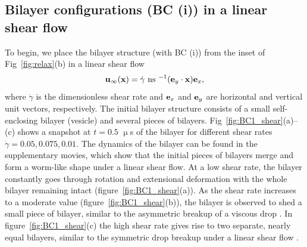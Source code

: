 \documentclass[prb,preprint,showpacs,preprintnumbers,amsmath,amssymb,longbibliography]{revtex4-1}
\newcommand{\xx}{\mathbf{x}}
\newcommand{\uu}{\mathbf{u}}
\begin{document}
\subsection{Bilayer configurations (BC (i)) in a linear shear flow}
To begin, we place the bilayer structure (with BC (i)) from the inset of Fig~\ref{fig:relax}(b)
in a linear shear flow
\begin{equation}
\uu_\infty(\xx) = \dot\gamma \text{ ns }^{-1} ({\bf e}_y \cdot \mathbf{x}) {\bf e}_x,
\end{equation}
%
where $\dot\gamma$ is the dimensionless shear rate and ${\bf e}_x$ and ${\bf e}_y$
are horizontal and vertical unit vectors, respectively.
The initial bilayer structure consists of a small self-enclosing bilayer (vesicle) and several pieces of bilayers.
Fig~\ref{fig:BC1_shear}(a)--(c)
shows a snapshot
at $t = 0.5$ $\upmu$s
of the bilayer for different shear rates $\dot\gamma= 0.05,0.075,0.01$.
The dynamics of the bilayer can be found in the supplementary movies,
which show that the initial pieces of bilayers merge and form a worm-like shape
under a linear shear flow.
At a low shear rate, the bilayer constantly goes through rotation and
extensional deformation with the whole bilayer remaining intact (figure~\ref{fig:BC1_shear}(a)).
As the shear rate increases to a moderate value (figure~\ref{fig:BC1_shear}(b)),
the bilayer is observed to shed a small piece of bilayer, 
similar to the asymmetric breakup of a viscous drop \cite{}.
In figure~\ref{fig:BC1_shear}(c) the high shear rate gives rise to two separate, nearly equal bilayers, 
similar to the symmetric drop breakup under a linear shear flow \cite{}.
\end{document}
